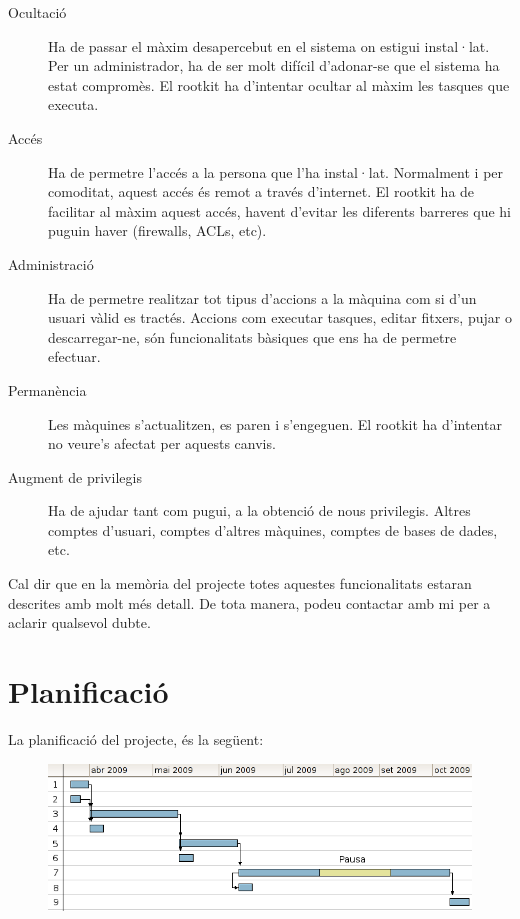 \documentclass[a4paper]{article}
\begin{document}
\begin{description}
    \item[Ocultació] Ha de passar el màxim desapercebut en el sistema on estigui
    instal·lat. Per un administrador, ha de ser molt difícil d'adonar-se que el
    sistema ha estat compromès. El rootkit ha d'intentar ocultar al màxim les tasques
    que executa. 

    \item[Accés] Ha de permetre l'accés a la persona que
    l'ha instal·lat. Normalment i per comoditat, aquest accés és remot a través
    d'internet. El rootkit ha de facilitar al màxim aquest accés, havent d'evitar les diferents 
    barreres que hi puguin haver (firewalls, ACLs, etc). 

    \item[Administració] Ha de permetre realitzar tot tipus
    d'accions a la màquina com si d'un usuari vàlid es tractés. Accions com executar
    tasques, editar fitxers, pujar o descarregar-ne, són funcionalitats bàsiques que ens
    ha de permetre efectuar. 

    \item[Permanència] Les màquines s'actualitzen, es paren i s'engeguen. El rootkit ha
    d'intentar no veure's afectat per aquests canvis. 

    \item[Augment de privilegis] Ha de ajudar tant com pugui, a la obtenció de nous
    privilegis. Altres comptes d'usuari, comptes d'altres màquines, comptes de bases de dades, etc.
\end{description}
Cal dir que en la memòria del projecte totes aquestes funcionalitats estaran descrites amb molt més detall. De 
tota manera, podeu contactar amb mi per a aclarir qualsevol dubte. 

\section{Planificació}

La planificació del projecte, és la següent:
\begin{figure}[htp]
    \centering
		\includegraphics[scale=0.7,keepaspectratio]{segon_gantt.png} 
    \label{fig:gantt}
\end{figure}
\end{document}
